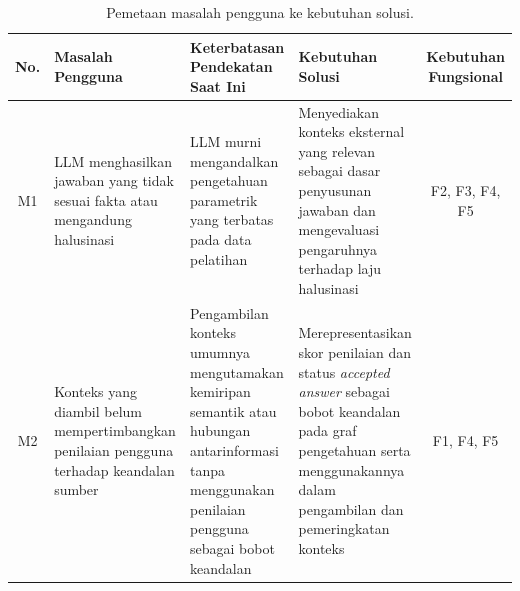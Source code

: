 \begin{table}[!htbp]
\centering
\caption{Pemetaan masalah pengguna ke kebutuhan solusi.}
\label{tab:kebutuhan-pengguna}
\small
\begin{tabularx}{\textwidth}{|c|>{\raggedright\arraybackslash}X|>{\raggedright\arraybackslash}X|>{\raggedright\arraybackslash}X|c|}
\hline
\textbf{No.} &
\textbf{Masalah Pengguna} &
\textbf{Keterbatasan Pendekatan Saat Ini} &
\textbf{Kebutuhan Solusi} &
\textbf{Kebutuhan Fungsional} \\
\hline
M1 &
LLM menghasilkan jawaban yang tidak sesuai fakta atau mengandung halusinasi &
LLM murni mengandalkan pengetahuan parametrik yang terbatas pada data pelatihan &
Menyediakan konteks eksternal yang relevan sebagai dasar penyusunan jawaban dan mengevaluasi pengaruhnya terhadap laju halusinasi &
F2, F3, F4, F5 \\
\hline
M2 &
Konteks yang diambil belum mempertimbangkan penilaian pengguna terhadap keandalan sumber &
Pengambilan konteks umumnya mengutamakan kemiripan semantik atau hubungan antarinformasi tanpa menggunakan penilaian pengguna sebagai bobot keandalan &
Merepresentasikan skor penilaian dan status \emph{accepted answer} sebagai bobot keandalan pada graf pengetahuan serta menggunakannya dalam pengambilan dan pemeringkatan konteks &
F1, F4, F5 \\
\hline
\end{tabularx}
\end{table}